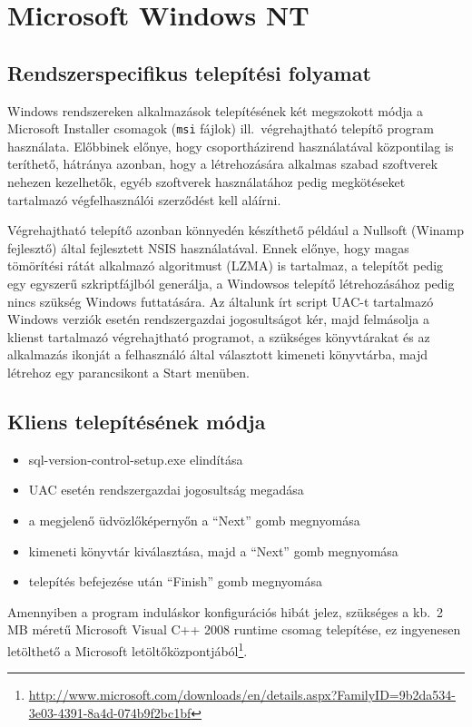 \documentclass[a4paper,12pt]{article}
\begin{document}
\clearpage
\section{Microsoft Windows NT}

\subsection{Rendszerspecifikus telepítési folyamat}

Windows rendszereken alkalmazások telepítésének két megszokott módja a Microsoft Installer
csomagok (\verb|msi| fájlok) ill.\ végrehajtható telepítő program használata. Előbbinek
előnye, hogy csoportházirend használatával központilag is teríthető, hátránya azonban,
hogy a létrehozására alkalmas szabad szoftverek nehezen kezelhetők, egyéb szoftverek
használatához pedig megkötéseket tartalmazó végfelhasználói szerződést kell aláírni.

Végrehajtható telepítő azonban könnyedén készíthető például a Nullsoft (Winamp fejlesztő)
által fejlesztett NSIS használatával. Ennek előnye, hogy magas tömörítési rátát alkalmazó
algoritmust (LZMA) is tartalmaz, a telepítőt pedig egy egyszerű szkriptfájlból generálja,
a Windowsos telepítő létrehozásához pedig nincs szükség Windows futtatására. Az általunk
írt script UAC-t tartalmazó Windows verziók esetén rendszergazdai jogosultságot kér, majd
felmásolja a klienst tartalmazó végrehajtható programot, a szükséges könyvtárakat és
az alkalmazás ikonját a felhasználó által választott kimeneti könyvtárba, majd létrehoz
egy parancsikont a Start menüben.

\subsection{Kliens telepítésének módja}

\begin{itemize}
\item sql-version-control-setup.exe elindítása
\item UAC esetén rendszergazdai jogosultság megadása
\item a megjelenő üdvözlőképernyőn a ``Next'' gomb megnyomása
\item kimeneti könyvtár kiválasztása, majd a ``Next'' gomb megnyomása
\item telepítés befejezése után ``Finish'' gomb megnyomása
\end{itemize}

Amennyiben a program induláskor konfigurációs hibát jelez, szükséges a kb.\ 2 MB méretű
Microsoft Visual C++ 2008 runtime csomag telepítése, ez ingyenesen letölthető a Microsoft
letöltőközpontjából\footnote{
\url{http://www.microsoft.com/downloads/en/details.aspx?FamilyID=9b2da534-3e03-4391-8a4d-074b9f2bc1bf}}.
\end{document}
